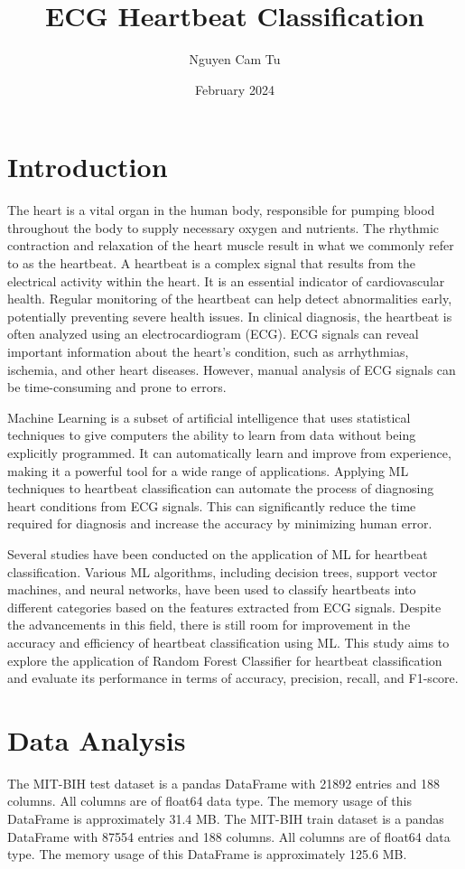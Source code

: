 \documentclass{article}
\title{ECG Heartbeat Classification}
\author{Nguyen Cam Tu}
\date{February 2024}
\begin{document}
\maketitle
\begin{multicols}{2}
\section{Introduction}
The heart is a vital organ in the human body, responsible for pumping blood throughout the body to supply necessary oxygen and nutrients. The rhythmic contraction and relaxation of the heart muscle result in what we commonly refer to as the heartbeat. A heartbeat is a complex signal that results from the electrical activity within the heart. It is an essential indicator of cardiovascular health. Regular monitoring of the heartbeat can help detect abnormalities early, potentially preventing severe health issues. In clinical diagnosis, the heartbeat is often analyzed using an electrocardiogram (ECG). ECG signals can reveal important information about the heart's condition, such as arrhythmias, ischemia, and other heart diseases. However, manual analysis of ECG signals can be time-consuming and prone to errors.

Machine Learning is a subset of artificial intelligence that uses statistical techniques to give computers the ability to learn from data without being explicitly programmed. It can automatically learn and improve from experience, making it a powerful tool for a wide range of applications. Applying ML techniques to heartbeat classification can automate the process of diagnosing heart conditions from ECG signals. This can significantly reduce the time required for diagnosis and increase the accuracy by minimizing human error.

Several studies have been conducted on the application of ML for heartbeat classification. Various ML algorithms, including decision trees, support vector machines, and neural networks, have been used to classify heartbeats into different categories based on the features extracted from ECG signals. Despite the advancements in this field, there is still room for improvement in the accuracy and efficiency of heartbeat classification using ML. This study aims to explore the application of Random Forest Classifier for heartbeat classification and evaluate its performance in terms of accuracy, precision, recall, and F1-score.

\section{Data Analysis}
The MIT-BIH test dataset is a pandas DataFrame with 21892 entries and 188 columns. All columns are of float64 data type. The memory usage of this DataFrame is approximately 31.4 MB. The MIT-BIH train dataset is a pandas DataFrame with 87554 entries and 188 columns. All columns are of float64 data type. The memory usage of this DataFrame is approximately 125.6 MB. 


\end{multicols}
\end{document}

